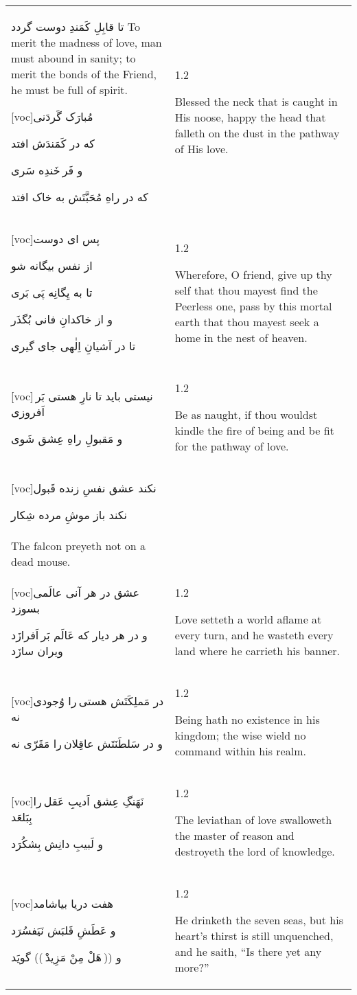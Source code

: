 \documentclass[11pt]{article}
\makeatletter
\newenvironment{orig}
  {\begin{farsi}[voc]}
  {\end{farsi}}
\newenvironment{trans}
  {\large\begin{spacing}{1.2}\raggedright}
  {\end{spacing}}
\newenvironment{word}
  {\begin{longtable}[t]{p{3in}@{\hspace{3em}}p{2.5in}}}
  {\end{longtable}}
\newcommand{\ayat}[2]{
  \begin{orig}#1\end{orig} &
  \vspace{1.5ex}\begin{trans}#2\end{trans} \vspace{-2ex}\\
}
\makeatother
\begin{document}
\begin{word}
{تا قابِلِ کَمَندِ دوست گردد}
     {To merit the madness of love, man must abound in sanity; to merit the
      bonds of the Friend, he must be full of spirit.}

\ayat{مُبارَک گَردَنی

که در کَمَندَش افتد

و فَر خَندِه سَری

که در راهِ مُحَبَّتَش به خاک افتد}
     {Blessed the neck that is caught in His noose, happy the head that
      falleth on the dust in the pathway of His love.}

\ayat{پس ای دوست

از نفس بيگانه شو

تا به يِگانِه پَی بَری

و از خاکدانِ فانی بُگذَر

تا در آشيانِ اِلٰهی جای گيری}
     {Wherefore, O friend, give up thy self that thou mayest find the Peerless
      one, pass by this mortal earth that thou mayest seek a home in the nest
      of heaven.}

\ayat{نيستی بايد تا نارِ هستی بَر اَفروزی

و مَقبولِ راهِ عِشق شَوی}
     {Be as naught, if thou wouldst kindle the fire of being and be fit for
      the pathway of love.}

\ayat{نکند عشق نفسِ زنده قَبول

نکند باز موشِ مرده شِکار}
     {Love seizeth not upon a living soul, \\
      The falcon preyeth not on a dead mouse.}

\ayat{عشق در هر آنی عالَمی بسوزد

و در هر ديار که عَالَم بَر اَفرازَد ويران سازَد}
     {Love setteth a world aflame at every turn, and he wasteth every land
      where he carrieth his banner.}

\ayat{در مَملِکَتَش هستی را وُجودی نه

و در سَلطَنَتَش عاقِلان را مَقَرّی نه}
     {Being hath no existence in his kingdom; the wise wield no command within
      his realm.}

\ayat{نَهَنگِ عِشق اَديبِ عَقل را بِبَلعَد

و لَبيبِ دانِش بِشکُرَد}
     {The leviathan of love swalloweth the master of reason and destroyeth the
      lord of knowledge.}

\ayat{هفت دريا بياشامد

و عَطَشِ قَلبَش نَيَفسُرَد

و (( هَلْ مِنْ مَزِيدْ )) گويَد}
     {He drinketh the seven seas, but his heart’s thirst is still unquenched,
      and he saith, “Is there yet any more?”}


\end{word}
\end{document}
